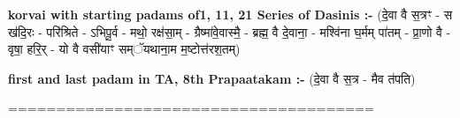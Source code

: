 \documentclass[17pt]{extarticle}
\begin{document}
\textbf{korvai with starting padams of1, 11, 21 Series of Dasinis :-} \newline
(दे॒वा वै स॒त्रꣳ - स ख॑दि॒रः - परि॑श्रिते - ऽभिपू॒र्व - मथो॒ रक्ष॑सा॒म् - ग्रैष्मा॑वे॒वास्मै॒ - ब्रह्म॒ वै दे॒वाना॒ - मश्वि॑ना घ॒र्मम् पा॑तम् - प्रा॒णो वै - वृषा॒ हरि॒र् - यो वै वसी॑याꣳ सम्ॅयथाना॒म म॒ष्टोत्त॑रश॒तम्) \newline

\textbf{first and last padam in TA, 8th Prapaatakam :-} \newline
(दे॒वा वै स॒त्र - मैव त॑पति) \newline 


====================================== \newline
\pagebreak
\pagebreak
        
\end{document}
